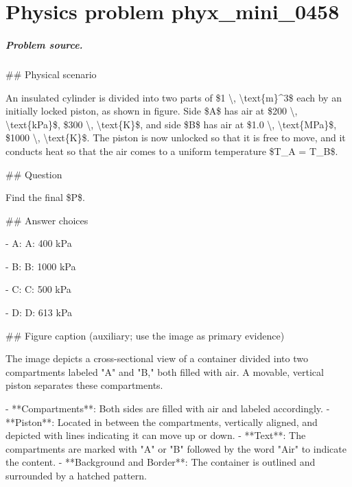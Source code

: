
\chapter{Physics problem phyx\_mini\_0458}
\label{ch:PhyXMiniProblems_problem_phyx_mini_0458}

\paragraph{Problem source.}
\#\# Physical scenario

An insulated cylinder is divided into two parts of \$1 \textbackslash{}, \textbackslash{}text\{m\}\textasciicircum{}3\$ each by an initially locked piston, as shown in figure. Side \$A\$ has air at \$200 \textbackslash{}, \textbackslash{}text\{kPa\}\$, \$300 \textbackslash{}, \textbackslash{}text\{K\}\$, and side \$B\$ has air at \$1.0 \textbackslash{}, \textbackslash{}text\{MPa\}\$, \$1000 \textbackslash{}, \textbackslash{}text\{K\}\$. The piston is now unlocked so that it is free to move, and it conducts heat so that the air comes to a uniform temperature \$T\_A = T\_B\$.

\#\# Question

Find the final \$P\$.

\#\# Answer choices

- A: A: 400 kPa

- B: B: 1000 kPa

- C: C: 500 kPa

- D: D: 613 kPa

\#\# Figure caption (auxiliary; use the image as primary evidence)

The image depicts a cross-sectional view of a container divided into two compartments labeled "A" and "B," both filled with air. A movable, vertical piston separates these compartments. 

- **Compartments**: Both sides are filled with air and labeled accordingly.
- **Piston**: Located in between the compartments, vertically aligned, and depicted with lines indicating it can move up or down.
- **Text**: The compartments are marked with "A" or "B" followed by the word "Air" to indicate the content.
- **Background and Border**: The container is outlined and surrounded by a hatched pattern.

